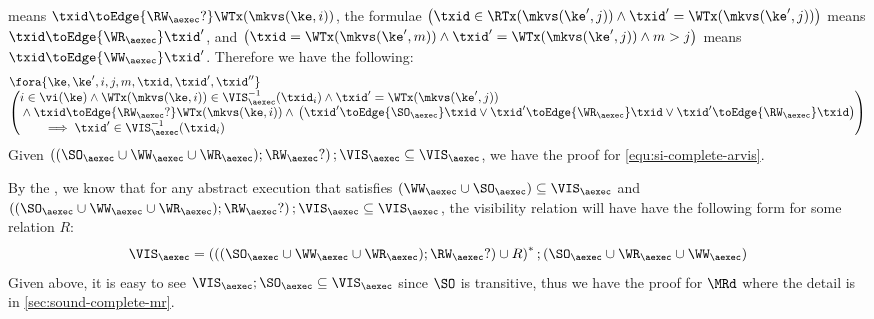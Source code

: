means \( \txid \toEdge{\RW_{\aexec}?} \WTx(\mkvs(\ke,i)) \),
the formulae \(\left( \begin{array}{@{}l@{}} \txid \in \RTx(\mkvs(\ke',j)) \land \txid' = \WTx(\mkvs(\ke',j)) \end{array} \right) \) 
means \( \txid \toEdge{\WR_\aexec} \txid' \),
and \( \left( \begin{array}{@{}l@{}} \txid = \WTx(\mkvs(\ke',m)) \land \txid' = \WTx(\mkvs(\ke',j)) \land m > j \end{array} \right) \) 
means \( \txid \toEdge{\WW_\aexec} \txid' \).
Therefore we have the following:
\[
    \begin{array}{@{}l@{}}
        \fora{\ke, \ke', i, j, m, \txid, \txid', \txid''} \\
        \left( \begin{array}{@{}l@{}}
        i \in \vi(\ke) 
        \land \WTx(\mkvs(\ke,i)) \in \VIS^{-1}_{\aexec}(\txid_{i}) 
        \land \txid' = \WTx(\mkvs(\ke',j)) \\
        {} \land \txid \toEdge{\RW_{\aexec}?} \WTx(\mkvs(\ke,i))  \land {} 
        \left(
        \begin{array}{@{}l @{}}
            \txid' \toEdge{\SO_\aexec} \txid \lor
            \txid' \toEdge{\WR_\aexec} \txid \lor
            \txid' \toEdge{\RW_\aexec} \txid 
        \end{array}
        \right)  \\
        \qquad \implies \txid' \in \VIS^{-1}_{\aexec}(\txid_{i})
        \end{array} \right)
    \end{array} \\
\]
Given \( \left( (\SO_{\aexec} \cup \WW_{\aexec} \cup \WR_{\aexec} ) ; \RW_{\aexec}? \right) ; \VIS_{\aexec}  \subseteq \VIS_\aexec \),
we have the proof for \cref{equ:si-complete-arvis}.

By the \cite{cerone:snapshot}, we know that for any abstract execution that satisfies \( (\WW_\aexec \cup \SO_\aexec) \subseteq \VIS_\aexec \)
and \( \left( (\SO_\aexec \cup \WW_\aexec \cup \WR_\aexec ) ; \RW_{\aexec}? \right) ; \VIS_\aexec \subseteq \VIS_\aexec \),
the visibility relation will have have the following form for some relation \( R \):
\[
    \VIS_\aexec = \left( \left( (\SO_\aexec \cup \WW_\aexec \cup \WR_\aexec ) ; \RW_{\aexec}? \right)  \cup R \right)^* ; (\SO_\aexec \cup \WR_\aexec \cup \WW_\aexec) 
\]
Given above, it is easy to see \( \VIS_\aexec ; \SO_\aexec \subseteq \VIS_\aexec \) since \( \SO \) is transitive, 
thus we have the proof for \( \MRd \) where the detail is in \cref{sec:sound-complete-mr}.

